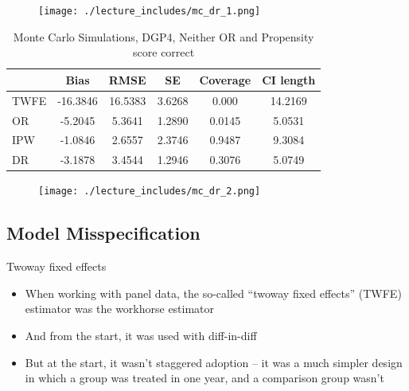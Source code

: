 \documentclass{beamer}
\begin{document}
\begin{frame}[plain]
	\begin{figure}
	\texttt{[image: ./lecture\_includes/mc\_dr\_1.png]}
	\end{figure}

\end{frame}


\begin{frame}[plain]

\begin{table}[htbp]\centering
\scriptsize
\caption{Monte Carlo Simulations, DGP4, Neither OR and Propensity score correct}
\centering
\begin{threeparttable}
\begin{tabular}{l*{5}{c}}
\toprule
\multicolumn{1}{l}{\textbf{}}&
\multicolumn{1}{c}{\textbf{Bias}}&
\multicolumn{1}{c}{\textbf{RMSE}}&
\multicolumn{1}{c}{\textbf{SE}}&
\multicolumn{1}{c}{\textbf{Coverage}}&
\multicolumn{1}{c}{\textbf{CI length}}\\
\midrule
TWFE & -16.3846 & 16.5383 & 3.6268 & 0.000 & 14.2169 \\
OR & -5.2045 & 5.3641 & 1.2890 & 0.0145 & 5.0531 \\
IPW & -1.0846 & 2.6557 & 2.3746 & 0.9487 & 9.3084 \\
DR & -3.1878 & 3.4544 & 1.2946 & 0.3076 & 5.0749 \\
\bottomrule
\end{tabular}
\end{threeparttable}
\end{table}

\end{frame}

\begin{frame}[plain]
	\begin{figure}
	\texttt{[image: ./lecture\_includes/mc\_dr\_2.png]}
	\end{figure}


\end{frame}




\subsection{Model Misspecification}

\begin{frame}{Twoway fixed effects}

\begin{itemize}
\item When working with panel data, the so-called ``twoway fixed effects'' (TWFE) estimator was the workhorse estimator
\item And from the start, it was used with diff-in-diff
\item But at the start, it wasn't staggered adoption -- it was a much simpler design in which a group was treated in one year, and a comparison group wasn't
\end{itemize}

\end{frame}
\end{document}
